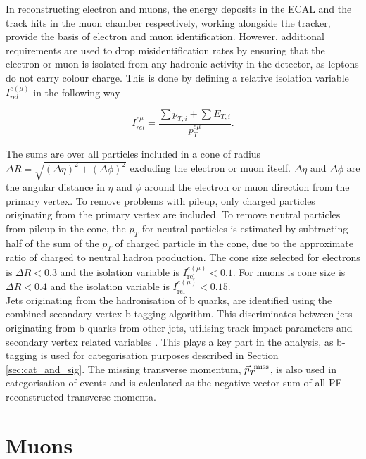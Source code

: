 In reconstructing electron and muons, the energy deposits in the ECAL and the track hits in the muon chamber respectively, working alongside the tracker, provide the basis of electron and muon identification. However, additional requirements are used to drop misidentification rates by ensuring that the electron or muon is isolated from any hadronic activity in the detector, as leptons do not carry colour charge. This is done by defining a relative isolation variable \(I_{rel}^{e(\mu)}\) in the following way

\begin{equation}
    I_{rel}^{e\mu} = \frac{\sum p_{T,i} + \sum E_{T,i}}{p_T^{e\mu}}.
\end{equation}

The sums are over all particles included in a cone of radius \(\Delta R = \sqrt{(\Delta \eta)^2 + (\Delta \phi)^2}\) excluding the electron or muon itself. \(\Delta \eta\) and \(\Delta \phi\) are the angular distance in \(\eta\) and \(\phi\) around the electron or muon direction from the primary vertex. To remove problems with pileup, only charged particles originating from the primary vertex are included. To remove neutral particles from pileup in the cone, the \(p_T\) for neutral particles is estimated by subtracting half of the sum of the \(p_T\) of charged particle in the cone, due to the approximate ratio of charged to neutral hadron production. The cone size selected for electrons is \(\Delta R<0.3\) and the isolation variable is \(I_{\text{rel}}^{e(\mu)} < 0.1\). For muons is cone size is \(\Delta R<0.4\) and the isolation variable is \(I_{\text{rel}}^{e(\mu)} < 0.15\). \\

Jets originating from the hadronisation of b quarks, are identified using the combined secondary vertex b-tagging algorithm. This discriminates between jets originating from b quarks from other jets, utilising track impact parameters and secondary vertex related variables \cite{CMS_btag}. This plays a key part in the analysis, as b-tagging is used for categorisation purposes described in Section \ref{sec:cat_and_sig}. The missing transverse momentum, \(\vec{p}_T^{\hspace{1ex}\text{miss}}\), is also used in categorisation of events and is calculated as the negative vector sum of all PF reconstructed transverse momenta.

\section{Muons}


